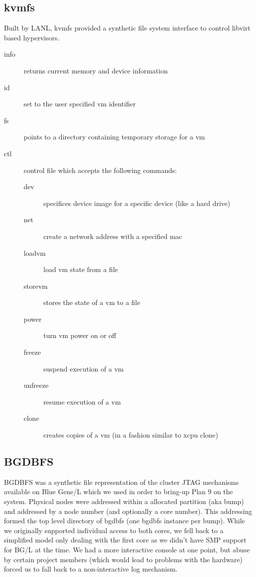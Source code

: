 \documentclass{sig-alternate}
\begin{document}
\subsection*{kvmfs}

Built by LANL, kvmfs provided a synthetic file system interface to 
control libvirt based hypervisors.

\begin{description}
\item[info] returns current memory and device information
\item[id] set to the user specified vm identifier
\item[fs] points to a directory containing temporary storage for a vm
\item[ctl] control file which accepts the following commands:
\begin{description}
\item[dev] specifices device image for a specific device (like a hard drive)
\item[net] create a network address with a specified mac
\item[loadvm] load vm state from a file
\item[storevm] stores the state of a vm to a file
\item[power] turn vm power on or off
\item[freeze] suspend execution of a vm
\item[unfreeze] resume execution of a vm
\item[clone] creates copies of a vm (in a fashion similar to xcpu clone)
\end{description}
\end{description}

\subsection*{BGDBFS}

{BGDBFS} was a synthetic file representation of the cluster JTAG mechanisms
available on Blue Gene/L which we used in order to bring-up Plan 9 on the
system.  Physical nodes were addressed within a allocated partition (aka bump)
and addressed by a node number (and optionally a core number).  This
addressing formed the top level directory of bgdbfs (one bgdbfs instance
per bump).  While we originally supported individual access to both cores, 
we fell back to a simplified model only dealing with the first core as we
didn't have SMP support for BG/L at the time.  We had a more interactive
console at one point, but abuse by certain project members (which would lead
to problems with the hardware) forced us to fall back to a non-interactive
log mechanism.
\end{document}
